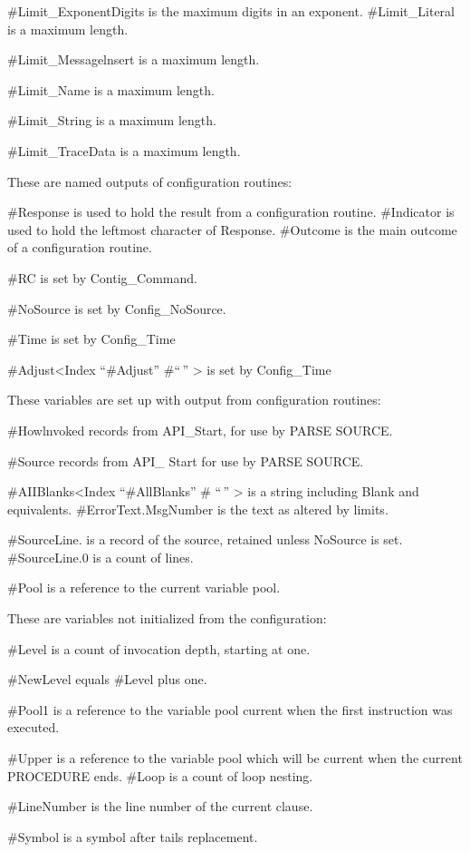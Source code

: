 \#Limit\_ExponentDigits is the maximum digits in an exponent.
\#Limit\_Literal is a maximum length.

\#Limit\_Messagelnsert is a maximum length.

\#Limit\_Name is a maximum length.

\#Limit\_String is a maximum length.

\#Limit\_TraceData is a maximum length.

These are named outputs of configuration routines:

\#Response is used to hold the result from a configuration routine.
\#Indicator is used to hold the leftmost character of Response.
\#Outcome is the main outcome of a configuration routine.

\#RC is set by Contig\_Command.

\#NoSource is set by Config\_NoSource.

\#Time is set by Config\_Time

\#Adjust\textless Index ``\#Adjust'' \#``\,'' \textgreater{} is set by
Config\_Time

These variables are set up with output from configuration routines:

\#Howlnvoked records from API\_Start, for use by PARSE SOURCE.

\#Source records from API\_ Start for use by PARSE SOURCE.

\#AIIBlanks\textless Index ``\#AllBlanks'' \# ``\,'' \textgreater{} is a
string including Blank and equivalents. \#ErrorText.MsgNumber is the
text as altered by limits.

\#SourceLine. is a record of the source, retained unless NoSource is
set. \#SourceLine.0 is a count of lines.

\#Pool is a reference to the current variable pool.

These are variables not initialized from the configuration:

\#Level is a count of invocation depth, starting at one.

\#NewLevel equals \#Level plus one.

\#Pool1 is a reference to the variable pool current when the first
instruction was executed.

\#Upper is a reference to the variable pool which will be current when
the current PROCEDURE ends. \#Loop is a count of loop nesting.

\#LineNumber is the line number of the current clause.

\#Symbol is a symbol after tails replacement.

